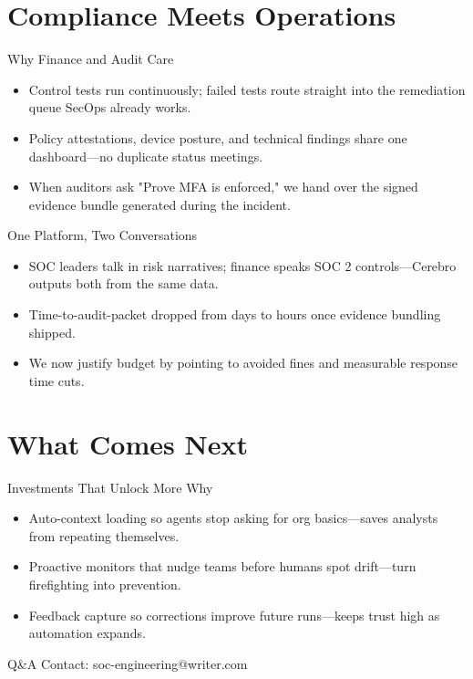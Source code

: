 \documentclass[aspectratio=169]{beamer}
\begin{document}
\section{Compliance Meets Operations}

\begin{frame}{Why Finance and Audit Care}
  \begin{itemize}
    \item Control tests run continuously; failed tests route straight into the remediation queue SecOps already works.
    \item Policy attestations, device posture, and technical findings share one dashboard—no duplicate status meetings.
    \item When auditors ask "Prove MFA is enforced," we hand over the signed evidence bundle generated during the incident.
  \end{itemize}
\end{frame}

\begin{frame}{One Platform, Two Conversations}
  \begin{itemize}
    \item SOC leaders talk in risk narratives; finance speaks SOC 2 controls—Cerebro outputs both from the same data.
    \item Time-to-audit-packet dropped from days to hours once evidence bundling shipped.
    \item We now justify budget by pointing to avoided fines and measurable response time cuts.
  \end{itemize}
\end{frame}

\section{What Comes Next}

\begin{frame}{Investments That Unlock More Why}
  \begin{itemize}
    \item Auto-context loading so agents stop asking for org basics—saves analysts from repeating themselves.
    \item Proactive monitors that nudge teams before humans spot drift—turn firefighting into prevention.
    \item Feedback capture so corrections improve future runs—keeps trust high as automation expands.
  \end{itemize}
\end{frame}

\begin{frame}{Q\&A}
  \centering
  Contact: soc-engineering@writer.com
\end{frame}
\end{document}
